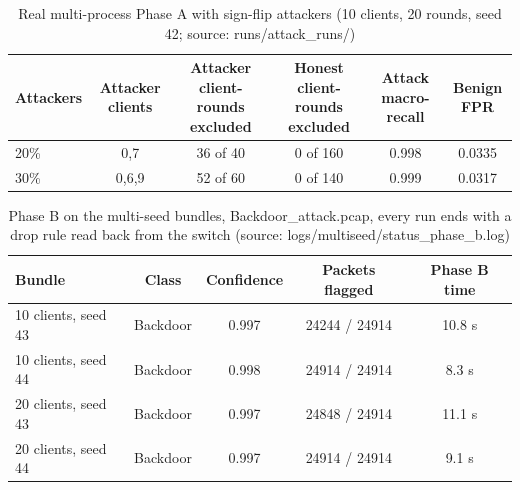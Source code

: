 \begin{table}[H]
\centering
\scriptsize
\setlength{\tabcolsep}{3pt}
\renewcommand{\arraystretch}{1.15}
\begin{tabular}{|l|c|c|c|c|c|}
\hline
\textbf{Attackers} & \textbf{Attacker clients} & \textbf{Attacker client-rounds excluded} & \textbf{Honest client-rounds excluded} & \textbf{Attack macro-recall} & \textbf{Benign FPR} \\ \hline
20\% & 0,7 & 36 of 40 & 0 of 160 & 0.998 & 0.0335 \\ \hline
30\% & 0,6,9 & 52 of 60 & 0 of 140 & 0.999 & 0.0317 \\ \hline
\end{tabular}
\caption{Real multi-process Phase A with sign-flip attackers (10 clients, 20 rounds, seed 42; source: runs/attack\_runs/)}
\label{tab:fu_attack_runs}
\end{table}

\begin{table}[H]
\centering
\scriptsize
\setlength{\tabcolsep}{3pt}
\renewcommand{\arraystretch}{1.15}
\begin{tabular}{|l|c|c|c|c|}
\hline
\textbf{Bundle} & \textbf{Class} & \textbf{Confidence} & \textbf{Packets flagged} & \textbf{Phase B time} \\ \hline
10 clients, seed 43 & Backdoor & 0.997 & 24244 / 24914 & 10.8 s \\ \hline
10 clients, seed 44 & Backdoor & 0.998 & 24914 / 24914 & 8.3 s \\ \hline
20 clients, seed 43 & Backdoor & 0.997 & 24848 / 24914 & 11.1 s \\ \hline
20 clients, seed 44 & Backdoor & 0.997 & 24914 / 24914 & 9.1 s \\ \hline
\end{tabular}
\caption{Phase B on the multi-seed bundles, Backdoor\_attack.pcap, every run ends with a drop rule read back from the switch (source: logs/multiseed/status\_phase\_b.log)}
\label{tab:fu_phase_b_seeds}
\end{table}
